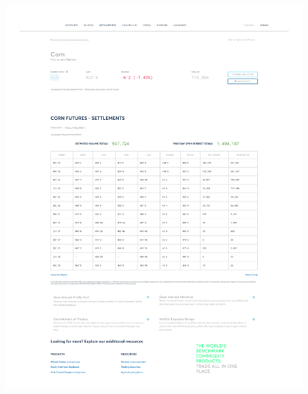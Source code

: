 \documentclass[10pt,a4paper]{article} %
\begin{document}
\begin{figure}[h]
  \centering
  \includegraphics[width=0.99\textwidth]{appendix/CORN12SEP.pdf}
  \label{fig:corn_settlements}
\end{figure}
\end{document}
